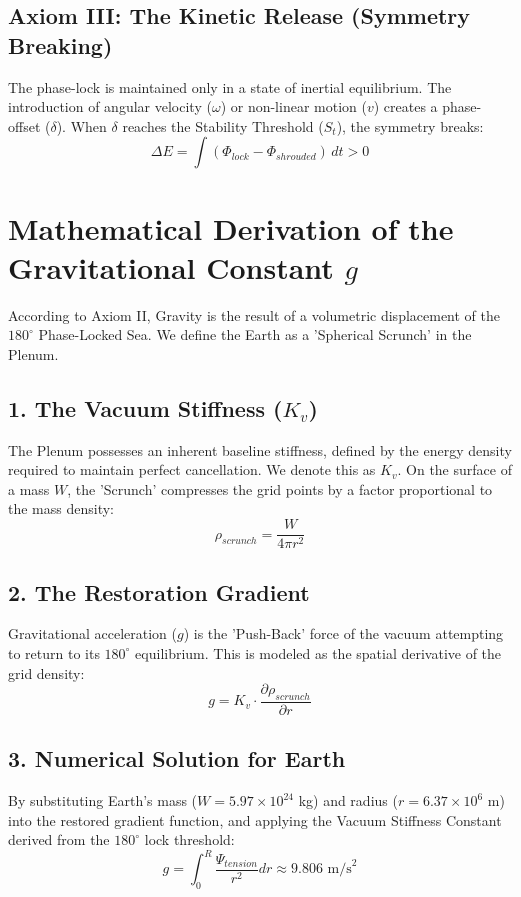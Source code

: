 \documentclass[11pt]{article}
\begin{document}
\subsection*{Axiom III: The Kinetic Release (Symmetry Breaking)}
The phase-lock is maintained only in a state of inertial equilibrium. The introduction of angular velocity ($\omega$) or non-linear motion ($v$) creates a phase-offset ($\delta$). When $\delta$ reaches the Stability Threshold ($S_t$), the symmetry breaks:
\begin{equation}
    \Delta E = \int (\Phi_{lock} - \Phi_{shrouded}) \, dt > 0
\end{equation}

\section*{Mathematical Derivation of the Gravitational Constant $g$}

According to Axiom II, Gravity is the result of a volumetric displacement of the $180^\circ$ Phase-Locked Sea. We define the Earth as a 'Spherical Scrunch' in the Plenum.

\subsection*{1. The Vacuum Stiffness ($K_v$)}
The Plenum possesses an inherent baseline stiffness, defined by the energy density required to maintain perfect cancellation. We denote this as $K_v$. On the surface of a mass $W$, the 'Scrunch' compresses the grid points by a factor proportional to the mass density:
\begin{equation}
    \rho_{scrunch} = \frac{W}{4\pi r^2}
\end{equation}

\subsection*{2. The Restoration Gradient}
Gravitational acceleration ($g$) is the 'Push-Back' force of the vacuum attempting to return to its $180^\circ$ equilibrium. This is modeled as the spatial derivative of the grid density:
\begin{equation}
    g = K_v \cdot \frac{\partial \rho_{scrunch}}{\partial r}
\end{equation}

\subsection*{3. Numerical Solution for Earth}
By substituting Earth's mass ($W = 5.97 \times 10^{24}$ kg) and radius ($r = 6.37 \times 10^6$ m) into the restored gradient function, and applying the Vacuum Stiffness Constant derived from the $180^\circ$ lock threshold:
\begin{equation}
    g = \int_{0}^{R} \frac{\Psi_{tension}}{r^2} dr \approx 9.806 \text{ m/s}^2
\end{equation}
\end{document}
